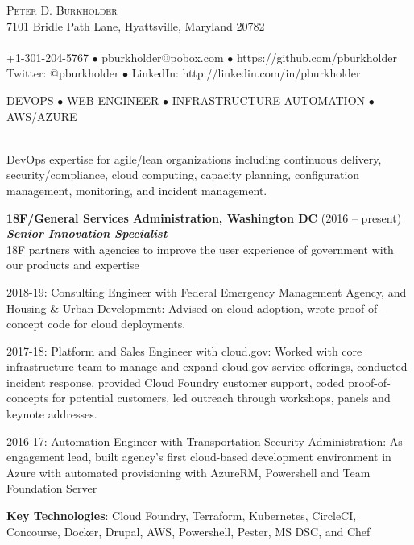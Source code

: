 \documentclass{article}
\newcommand{\lineunder}{\vspace*{-8pt} \\ \hspace*{-18pt} \hrulefill \\}
\newcommand{\header}[1]{{\hspace*{-15pt}\vspace*{6pt} \textsc{#1}} \vspace*{-6pt} \lineunder}
\newcommand{\centeredheader}[1]{
  \vspace*{6pt}
  \begin{center}
    \textsc{#1}
    \lineunder
  \end{center}
}
\newcommand{\employer}[3]{{ \textbf{#1} (#2)\\ \underline{\textbf{\emph{#3}}}\\ \nopagebreak }}
\newcommand{\contact}[3]{
    \vspace*{-8pt}
    \begin{center}
        {\LARGE \scshape {#1}}\\
        #2 \lineunder
        #3
    \end{center}
    \vspace*{-8pt}
}
\newenvironment{achievements}{\begin{list}{\topsep 0pt \itemsep -2pt}} {\vspace*{4pt}\end{list}}
\begin{document}
\smallskip
\vspace*{-44pt}

\contact{Peter D. Burkholder}
  {7101 Bridle Path Lane, Hyattsville, Maryland 20782}
  {+1-301-204-5767 $\bullet$ pburkholder@pobox.com  $\bullet$ https://github.com/pburkholder
    \linebreak Twitter: @pburkholder $\bullet$ LinkedIn: http://linkedin.com/in/pburkholder }

\centeredheader{DEVOPS $\bullet$ WEB ENGINEER $\bullet$ INFRASTRUCTURE AUTOMATION $\bullet$ AWS/AZURE}
  DevOps expertise for agile/lean organizations including continuous delivery, 
  security/compliance, cloud computing, capacity planning, configuration management, 
  monitoring, and incident management.

\smallskip
\vspace*{16pt}

\employer{18F/General Services Administration, Washington DC}{2016 -- present}{Senior Innovation Specialist}
\smallskip
18F partners with agencies to improve the user experience of government with our products and expertise
\begin{achievements}
  \item 2018-19: Consulting Engineer with Federal Emergency Management Agency, and Housing \&
    Urban Development: Advised on cloud adoption, wrote proof-of-concept code for cloud deployments.
  \item 2017-18: Platform and Sales Engineer with cloud.gov: Worked with core infrastructure team to manage and expand 
    cloud.gov service offerings, conducted incident response, provided Cloud Foundry customer support, coded proof-of-concepts for
    potential customers, led outreach through workshops, panels and keynote addresses.
  \item 2016-17: Automation Engineer with Transportation Security Administration: As engagement lead, 
  built agency's first cloud-based development environment in Azure with automated provisioning with 
  AzureRM, Powershell and Team Foundation Server
  \item \textbf{Key Technologies}: Cloud Foundry, Terraform, Kubernetes, 
    CircleCI, Concourse, Docker, Drupal, AWS, Powershell, Pester, MS DSC, and Chef
  
\end{achievements}
\end{document}
